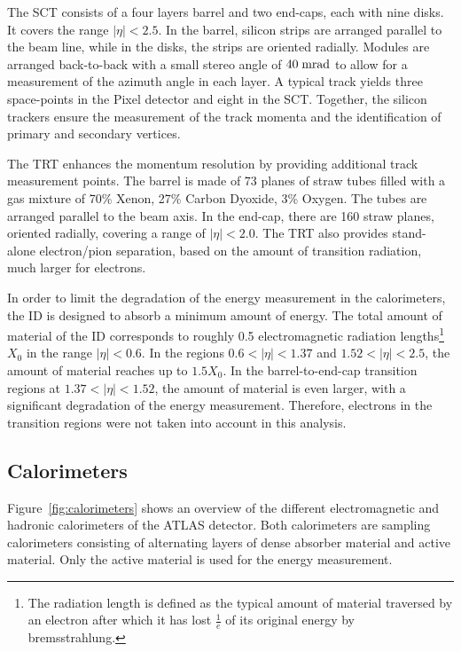 The SCT consists of a four layers barrel and two end-caps, each with
nine disks. It covers the range \mbox{$|\eta| < 2.5$}.
In the barrel, silicon strips are arranged parallel to the beam line,
while in the disks, the strips are oriented radially.
Modules are arranged back-to-back with a small stereo angle of
\mbox{$40 \; \mathrm{mrad}$} to allow for a measurement of the azimuth angle in
each layer. A typical track yields three space-points in the Pixel
detector and eight in the SCT. Together, the silicon trackers ensure
the measurement of the track momenta and the identification of primary
and secondary vertices. 

The TRT enhances the momentum resolution by providing additional track
measurement points.
The barrel is made of 73 planes of straw tubes filled with a gas
mixture of 70\% Xenon, 27\% Carbon Dyoxide, 3\% Oxygen. The tubes are
arranged parallel to the beam axis.
In the end-cap, there are 160 straw planes, oriented radially,
covering a range of \mbox{$|\eta| < 2.0$}. 
The TRT also provides stand-alone electron/pion separation, based on
the amount of transition radiation, much larger for electrons.

In order to limit the degradation of the energy measurement in the
calorimeters, the ID is designed to absorb a minimum amount of energy.
The total amount of material of the ID corresponds to roughly 0.5
electromagnetic radiation lengths\footnote{The radiation length is
  defined as the typical amount of material traversed by an electron
  after which it has lost $\frac{1}{e}$ of its original energy by
  bremsstrahlung.} $X_0$ in the range \mbox{$|\eta| < 0.6$}.
In the regions \mbox{$0.6 < |\eta| < 1.37$} and \mbox{$1.52 < |\eta| <
  2.5$}, the amount of material reaches up to \mbox{$1.5 X_0$}.
In the barrel-to-end-cap transition regions at \mbox{$1.37 < |\eta| <
  1.52$}, the amount of material is even larger, with a significant
degradation of the energy measurement.
Therefore, electrons in the transition regions were not taken into
account in this analysis.

\subsection{Calorimeters}
\label{sec:calorimeter}

Figure~\ref{fig:calorimeters} shows an overview of the different electromagnetic 
and hadronic calorimeters of the ATLAS detector.
Both calorimeters are sampling calorimeters consisting of alternating layers
of dense absorber material and active material.
Only the active material is used for the energy measurement.

